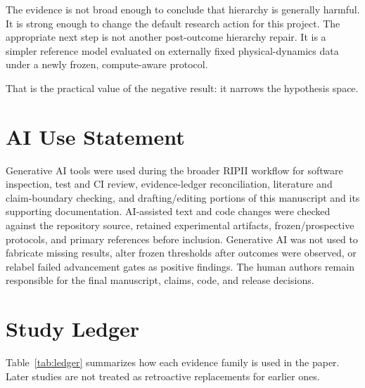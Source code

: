 \documentclass[10pt]{article}
\begin{document}
The evidence is not broad enough to conclude that hierarchy is generally harmful. It is strong enough to change the default research action for this project. The appropriate next step is not another post-outcome hierarchy repair. It is a simpler reference model evaluated on externally fixed physical-dynamics data under a newly frozen, compute-aware protocol.

That is the practical value of the negative result: it narrows the hypothesis space.


\section*{AI Use Statement}

Generative AI tools were used during the broader RIPII workflow for software inspection, test and CI review, evidence-ledger reconciliation, literature and claim-boundary checking, and drafting/editing portions of this manuscript and its supporting documentation. AI-assisted text and code changes were checked against the repository source, retained experimental artifacts, frozen/prospective protocols, and primary references before inclusion. Generative AI was not used to fabricate missing results, alter frozen thresholds after outcomes were observed, or relabel failed advancement gates as positive findings. The human authors remain responsible for the final manuscript, claims, code, and release decisions.

\appendix

\section{Study Ledger}

Table~\ref{tab:ledger} summarizes how each evidence family is used in the paper. Later studies are not treated as retroactive replacements for earlier ones.
\end{document}
